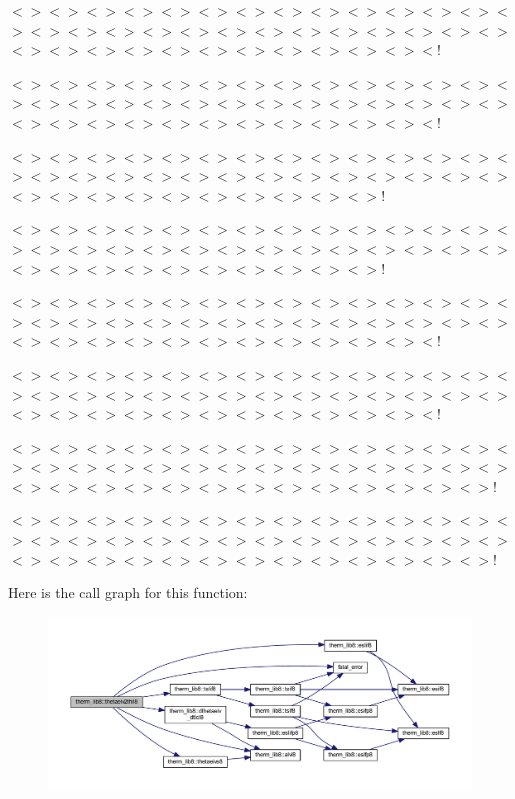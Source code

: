 $<$$>$$<$$>$$<$$>$$<$$>$$<$$>$$<$$>$$<$$>$$<$$>$$<$$>$$<$$>$$<$$>$$<$$>$$<$$>$$<$$>$$<$$>$$<$$>$$<$$>$$<$$>$$<$$>$$<$$>$$<$$>$$<$$>$$<$$>$$<$$>$$<$$>$$<$$>$$<$$>$$<$$>$$<$$>$$<$$>$$<$$>$$<$$>$$<$$>$$<$$>$$<$$>$$<$$>$$<$$>$$<$$>$$<$!

$<$$>$$<$$>$$<$$>$$<$$>$$<$$>$$<$$>$$<$$>$$<$$>$$<$$>$$<$$>$$<$$>$$<$$>$$<$$>$$<$$>$$<$$>$$<$$>$$<$$>$$<$$>$$<$$>$$<$$>$$<$$>$$<$$>$$<$$>$$<$$>$$<$$>$$<$$>$$<$$>$$<$$>$$<$$>$$<$$>$$<$$>$$<$$>$$<$$>$$<$$>$$<$$>$$<$$>$$<$$>$$<$$>$$<$!

$<$$>$$<$$>$$<$$>$$<$$>$$<$$>$$<$$>$$<$$>$$<$$>$$<$$>$$<$$>$$<$$>$$<$$>$$<$$>$$<$$>$$<$$>$$<$$>$$<$$>$$<$$>$$<$$>$$<$$>$$<$$>$$<$$>$$<$$>$$<$$>$$<$$>$$<$$>$$<$$>$$<$$>$$<$$>$$<$$>$$<$$>$$<$$>$$<$$>$$<$$>$$<$$>$$<$$>$$<$$>$!

$<$$>$$<$$>$$<$$>$$<$$>$$<$$>$$<$$>$$<$$>$$<$$>$$<$$>$$<$$>$$<$$>$$<$$>$$<$$>$$<$$>$$<$$>$$<$$>$$<$$>$$<$$>$$<$$>$$<$$>$$<$$>$$<$$>$$<$$>$$<$$>$$<$$>$$<$$>$$<$$>$$<$$>$$<$$>$$<$$>$$<$$>$$<$$>$$<$$>$$<$$>$$<$$>$$<$$>$$<$$>$!

$<$$>$$<$$>$$<$$>$$<$$>$$<$$>$$<$$>$$<$$>$$<$$>$$<$$>$$<$$>$$<$$>$$<$$>$$<$$>$$<$$>$$<$$>$$<$$>$$<$$>$$<$$>$$<$$>$$<$$>$$<$$>$$<$$>$$<$$>$$<$$>$$<$$>$$<$$>$$<$$>$$<$$>$$<$$>$$<$$>$$<$$>$$<$$>$$<$$>$$<$$>$$<$$>$$<$$>$$<$$>$$<$$>$$<$!

$<$$>$$<$$>$$<$$>$$<$$>$$<$$>$$<$$>$$<$$>$$<$$>$$<$$>$$<$$>$$<$$>$$<$$>$$<$$>$$<$$>$$<$$>$$<$$>$$<$$>$$<$$>$$<$$>$$<$$>$$<$$>$$<$$>$$<$$>$$<$$>$$<$$>$$<$$>$$<$$>$$<$$>$$<$$>$$<$$>$$<$$>$$<$$>$$<$$>$$<$$>$$<$$>$$<$$>$$<$$>$$<$$>$$<$!

$<$$>$$<$$>$$<$$>$$<$$>$$<$$>$$<$$>$$<$$>$$<$$>$$<$$>$$<$$>$$<$$>$$<$$>$$<$$>$$<$$>$$<$$>$$<$$>$$<$$>$$<$$>$$<$$>$$<$$>$$<$$>$$<$$>$$<$$>$$<$$>$$<$$>$$<$$>$$<$$>$$<$$>$$<$$>$$<$$>$$<$$>$$<$$>$$<$$>$$<$$>$$<$$>$$<$$>$$<$$>$$<$$>$$<$$>$$<$$>$!

$<$$>$$<$$>$$<$$>$$<$$>$$<$$>$$<$$>$$<$$>$$<$$>$$<$$>$$<$$>$$<$$>$$<$$>$$<$$>$$<$$>$$<$$>$$<$$>$$<$$>$$<$$>$$<$$>$$<$$>$$<$$>$$<$$>$$<$$>$$<$$>$$<$$>$$<$$>$$<$$>$$<$$>$$<$$>$$<$$>$$<$$>$$<$$>$$<$$>$$<$$>$$<$$>$$<$$>$$<$$>$$<$$>$$<$$>$$<$$>$! 

Here is the call graph for this function\+:\nopagebreak
\begin{figure}[H]
\begin{center}
\leavevmode
\includegraphics[width=350pt]{namespacetherm__lib8_aeb2f84da15d0d99455778580d72dbde5_cgraph}
\end{center}
\end{figure}


